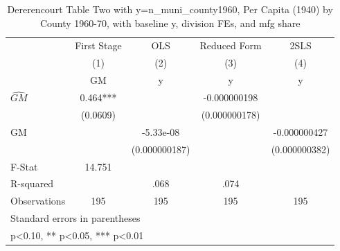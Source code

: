 \begin{table}[htbp]\centering
\def\sym#1{\ifmmode^{#1}\else\(^{#1}\)\fi}
\caption{Dererencourt Table Two with y=n\_muni\_county1960, Per Capita (1940) by County 1960-70, with baseline y, division FEs, and mfg share}
\begin{tabular}{l*{4}{c}}
\toprule
                    & First Stage   &         OLS   &Reduced Form   &        2SLS   \\
                    &\multicolumn{1}{c}{(1)}&\multicolumn{1}{c}{(2)}&\multicolumn{1}{c}{(3)}&\multicolumn{1}{c}{(4)}\\
                    &\multicolumn{1}{c}{GM}&\multicolumn{1}{c}{y}&\multicolumn{1}{c}{y}&\multicolumn{1}{c}{y}\\
\midrule
$\hat{GM}$          &       0.464***&               &-0.000000198   &               \\
                    &    (0.0609)   &               &(0.000000178)   &               \\
\addlinespace
GM                  &               &   -5.33e-08   &               &-0.000000427   \\
                    &               &(0.000000187)   &               &(0.000000382)   \\
\midrule
F-Stat              &      14.751   &               &               &               \\
R-squared           &               &        .068   &        .074   &               \\
Observations        &         195   &         195   &         195   &         195   \\
\bottomrule
\multicolumn{5}{l}{\footnotesize Standard errors in parentheses}\\
\multicolumn{5}{l}{\footnotesize * p<0.10, ** p<0.05, *** p<0.01}\\
\end{tabular}
\end{table}

